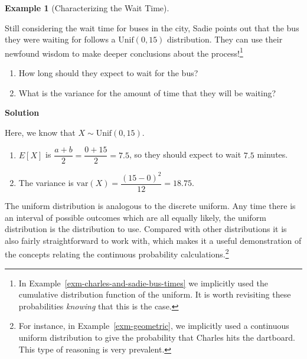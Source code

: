 \documentclass[
  letterpaper,
  DIV=11,
  numbers=noendperiod]{scrreprt}
\providecommand{\tightlist}{%
  \setlength{\itemsep}{0pt}\setlength{\parskip}{0pt}}\usepackage{longtable,booktabs,array}
\theoremstyle{definition}
\theoremstyle{definition}
\newtheorem{example}{Example}[chapter]
\theoremstyle{definition}
\theoremstyle{remark}
\begin{document}
\begin{example}[Characterizing the Wait
Time]\protect\hypertarget{exm-charles-and-sadie-bus-times-expected}{}\label{exm-charles-and-sadie-bus-times-expected}

Still considering the wait time for buses in the city, Sadie points out
that the bus they were waiting for follows a \(\text{Unif}(0,15)\)
distribution. They can use their newfound wisdom to make deeper
conclusions about the process!\footnote{In
  Example~\ref{exm-charles-and-sadie-bus-times} we implicitly used the
  cumulative distribution function of the uniform. It is worth
  revisiting these probabilities \emph{knowing} that this is the case.}

\begin{enumerate}
\def\labelenumi{\alph{enumi}.}
\tightlist
\item
  How long should they expect to wait for the bus?
\item
  What is the variance for the amount of time that they will be waiting?
\end{enumerate}

\begin{tcolorbox}[enhanced jigsaw, colback=white, colframe=quarto-callout-color-frame, arc=.35mm, leftrule=.75mm, rightrule=.15mm, opacityback=0, breakable, bottomrule=.15mm, left=2mm, toprule=.15mm]

\vspace{-3mm}\textbf{Solution}\vspace{3mm}

Here, we know that \(X\sim\text{Unif}(0,15)\).

\begin{enumerate}
\def\labelenumi{\alph{enumi}.}
\tightlist
\item
  \(E[X]\) is \(\dfrac{a+b}{2} = \dfrac{0+15}{2} = 7.5\), so they should
  expect to wait \(7.5\) minutes.
\item
  The variance is \(\text{var}(X) = \dfrac{(15 - 0)^2}{12} = 18.75\).
\end{enumerate}

\end{tcolorbox}

\end{example}

The uniform distribution is analogous to the discrete uniform. Any time
there is an interval of possible outcomes which are all equally likely,
the uniform distribution is the distribution to use. Compared with other
distributions it is also fairly straightforward to work with, which
makes it a useful demonstration of the concepts relating the continuous
probability calculations.\footnote{For instance, in
  Example~\ref{exm-geometric}, we implicitly used a continuous uniform
  distribution to give the probability that Charles hits the dartboard.
  This type of reasoning is very prevalent.}
\end{document}
